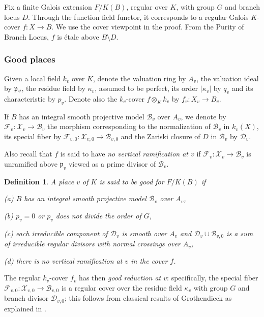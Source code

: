 \documentclass[12pt,english]{amsart}
\newtheorem{twisting lemma}[theorem]{Twisting lemma}
\newtheorem{definition}[theorem]{Definition}
\begin{document}
Fix a finite Galois extension $F/K(B)$, regular over $K$, with group $G$ and branch locus $D$. 
Through the function field functor, it corresponds to a regular Galois $K$-cover $f:X \rightarrow B$. We use the cover viewpoint in the proof. From the Purity of Branch Locus, $f$ is \'etale above $B\setminus D$. 

\subsubsection{Good places} \label{sssec:good reduction}  

Given a local field $k_v$ over $K$, denote the va\-lua\-tion ring by $A_v$, the valuation ideal by ${\frak p}_v$, the residue field by $\kappa_v$, assumed to be perfect, its order $|\kappa_v|$ by $q_v$ and its characteristic by $p_v$. Denote also the $k_v$-cover $f\otimes_Kk_v$ by $f_v:X_v\rightarrow B_v$.

If $B$ has an integral smooth projective model ${\mathcal B}_v$ over $A_v$, we denote by ${\mathcal F}_v: {\mathcal X}_v \rightarrow {\mathcal B}_v$ the morphism corresponding to the normalization  of ${\mathcal B}_v$ in $k_v(X)$, its special fiber by ${\mathcal F}_{v,{{0}}}: {\mathcal X}_{v,{{0}}} \rightarrow {\mathcal B}_{v,{{0}}}$
and the Zariski closure of $D$ in ${\mathcal B}_v$ by ${\mathcal D}_v$. 

Also recall that $f$ is said to have {\it no vertical ramification at $v$} if ${\mathcal F}_v: {\mathcal X}_v\rightarrow {\mathcal B}_v$ is unramified above ${\mathfrak p}_v$ viewed as a prime divisor of ${\mathcal B}_v$. 

\begin{definition} \label{def:good-place} A place $v$ of $K$ is said to be {\it good} for $F/K(B)$ if
\vskip 1mm

\noindent
(a) $B$ has an integral smooth projective model ${\mathcal B}_v$ over $A_v$,
\vskip 1mm

\noindent
(b) $p_v=0$ or $p_v$ does not divide the order of $G$,
\vskip 1mm

\noindent
(c) each irreducible component of ${\mathcal D}_v$ is smooth over $A_v$ and  ${\mathcal D}_v \cup  {\mathcal B}_{v,{{0}}}$ is a sum of irreducible regular divisors with normal crossings over $A_v$,
\vskip 1mm

\noindent
(d) there is no vertical ramification at $v$ in the cover $f$.
\end{definition}

The regular $k_v$-cover $f_v$ has then {\it good reduction at $v$}: specifically, the special fiber ${\mathcal F}_{v,{{0}}}: {\mathcal X}_{v,{{0}}} \rightarrow {\mathcal B}_{v,{{0}}}$ is a regular cover over the residue field $\kappa_v$ with group $G$ and branch divisor ${\mathcal D}_{v,{{0}}}$; this follows from classical results of Grothendieck as explained in \cite[\S \S 2.4.1-2.4.4]{DEGha}. 
\end{document}
